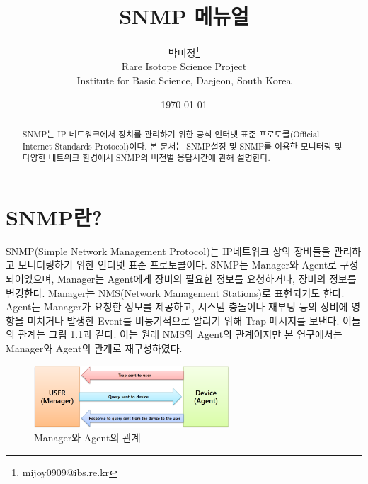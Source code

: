 \documentclass[11pt
  , a4paper
  , article
  , oneside
]{memoir}
\begin{document}
\newcommand{\technumber}{
  RAON Control-Document Series\\
  Revision : v1.0,   Release : Jan. 02. 2015}
\title{\textbf{SNMP 메뉴얼}}

\author{박미정\thanks{mijoy0909@ibs.re.kr} \\

  Rare Isotope Science Project\\
  Institute for Basic Science, Daejeon, South Korea
}
\date{\today}

\renewcommand{\maketitlehooka}{\begin{flushright}\textsf{\technumber}\end{flushright}}

\maketitle

\begin{abstract}
SNMP는 IP 네트워크에서 장치를 관리하기 위한 공식 인터넷 표준 프로토콜(Official Internet Standards Protocol)\citep{oisp}이다. 본 문서는 SNMP설정 및 SNMP를 이용한 모니터링 및 다양한 네트워크 환경에서 SNMP의 버전별 응답시간에 관해 설명한다. 
\end{abstract}

\chapter{SNMP란?}
SNMP(Simple Network Management Protocol)는 IP네트워크 상의 장비들을 관리하고 모니터링하기 위한 인터넷 표준 프로토콜이다. SNMP는 Manager와 Agent로 구성되어있으며, Manager는 Agent에게 장비의 필요한 정보를 요청하거나, 장비의 정보를 변경한다. Manager는 NMS(Network Management Stations)로 표현되기도 한다. Agent는 Manager가 요청한 정보를 제공하고, 시스템 충돌이나 재부팅 등의 장비에 영향을 미치거나 발생한 Event를 비동기적으로 알리기 위해 Trap 메시지를 보낸다. 이들의 관계는 그림 \ref{fig:relationship_m_a}\citep{essential_snmp}과 같다. 이는 원래 NMS와 Agent의 관계이지만 본 연구에서는 Manager와 Agent의 관계로 재구성하였다.
\begin{figure}[h!]
  \centering
  \includegraphics[width=0.65\textwidth]{./images/relationship_m_a.eps}
  \caption{Manager와 Agent의 관계}
  \label{fig:relationship_m_a}   
\end{figure}
\end{document}
